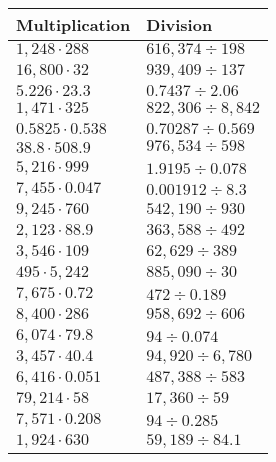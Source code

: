 \begin{longtable}[]{@{}ll@{}}
\toprule
Multiplication & Division\tabularnewline
\midrule
\endhead
\(1,248\cdot288\) & \(616,374÷198\)\tabularnewline
\(16,800\cdot32\) & \(939,409÷137\)\tabularnewline
\(5.226\cdot23.3\) & \(0.7437÷2.06\)\tabularnewline
\(1,471\cdot325\) & \(822,306÷8,842\)\tabularnewline
\(0.5825\cdot0.538\) & \(0.70287÷0.569\)\tabularnewline
\(38.8\cdot508.9\) & \(976,534÷598\)\tabularnewline
\(5,216\cdot999\) & \(1.9195÷0.078\)\tabularnewline
\(7,455\cdot0.047\) & \(0.001912÷8.3\)\tabularnewline
\(9,245\cdot760\) & \(542,190÷930\)\tabularnewline
\(2,123\cdot88.9\) & \(363,588÷492\)\tabularnewline
\(3,546\cdot109\) & \(62,629÷389\)\tabularnewline
\(495\cdot5,242\) & \(885,090÷30\)\tabularnewline
\(7,675\cdot0.72\) & \(472÷0.189\)\tabularnewline
\(8,400\cdot286\) & \(958,692÷606\)\tabularnewline
\(6,074\cdot79.8\) & \(94÷0.074\)\tabularnewline
\(3,457\cdot40.4\) & \(94,920÷6,780\)\tabularnewline
\(6,416\cdot0.051\) & \(487,388÷583\)\tabularnewline
\(79,214\cdot58\) & \(17,360÷59\)\tabularnewline
\(7,571\cdot0.208\) & \(94÷0.285\)\tabularnewline
\(1,924\cdot630\) & \(59,189÷84.1\)\tabularnewline
\bottomrule
\end{longtable}
